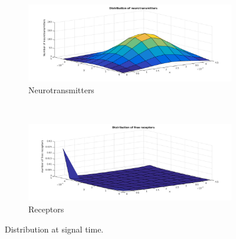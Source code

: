 %


\begin{figure}[h!]
    \centering
    \begin{subfigure}[b]{0.5\textwidth}
        \centering
        \includegraphics[scale=0.25]{1}
        \caption{Neurotransmitters}
    \end{subfigure}%
    ~ 
    \begin{subfigure}[b]{0.5\textwidth}
        \centering
        \includegraphics[scale=0.25]{2}
        \caption{Receptors}
        \label{fig1}
    \end{subfigure}
    \caption{Distribution at signal time.}
\end{figure}

